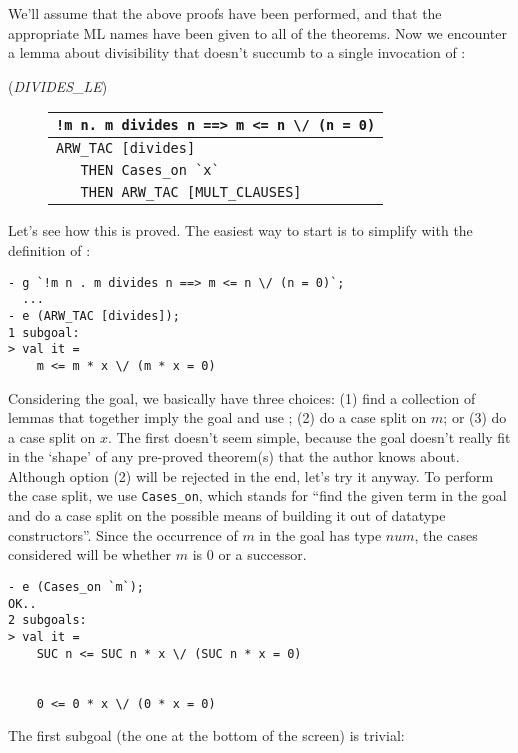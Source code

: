 \noindent We'll assume that the above proofs have been performed, and
that the appropriate ML names have been given to all of the theorems.
Now we encounter a lemma about divisibility that doesn't succumb to a
single invocation of :
\begin{description}
\item [\small{({\it DIVIDES\_LE\/})}]
\begin{tabular}[t]{l}
\verb+!m n. m divides n ==> m <= n \/ (n = 0)+ \\ \hline
\verb+ARW_TAC [divides]+ \\
\verb+   THEN Cases_on `x`+ \\
\verb+   THEN ARW_TAC [MULT_CLAUSES]+ \\
\end{tabular}
\end{description}
Let's see how this is proved. The easiest way to start is to simplify
with the definition of :
\begin{session}\begin{verbatim}
- g `!m n . m divides n ==> m <= n \/ (n = 0)`;
  ...
- e (ARW_TAC [divides]);
1 subgoal:
> val it =
    m <= m * x \/ (m * x = 0)
\end{verbatim}\end{session}
Considering the goal, we basically have three choices: (1) find a
collection of lemmas that together imply the goal and use
; (2) do a case split on $m$; or (3) do a case split on
$x$. The first doesn't seem simple, because the goal doesn't really fit
in the `shape' of any pre-proved theorem(s) that the author knows
about. Although option (2) will be rejected in the end, let's try it
anyway. To perform the case split, we use \verb+Cases_on+, which stands
for ``find the given term in the goal and do a case split on the
possible means of building it out of datatype constructors''. Since the
occurrence of $m$ in the goal has type $num$, the cases considered will
be whether $m$ is $0$ or a successor.
\begin{session}\begin{verbatim}
- e (Cases_on `m`);
OK..
2 subgoals:
> val it =
    SUC n <= SUC n * x \/ (SUC n * x = 0)


    0 <= 0 * x \/ (0 * x = 0)
\end{verbatim}\end{session}
\noindent The first subgoal (the one at the bottom of the screen) is trivial:

